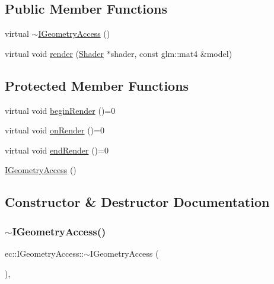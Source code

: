 \subsection*{Public Member Functions}
\begin{DoxyCompactItemize}
\item 
virtual \mbox{\hyperlink{classec_1_1_i_geometry_access_a786b4a8489f1c7fd6c4c2685fc53e7dc}{$\sim$\+I\+Geometry\+Access}} ()
\item 
virtual void \mbox{\hyperlink{classec_1_1_i_geometry_access_a478e674624120a644c05be9be4e386b8}{render}} (\mbox{\hyperlink{classec_1_1_shader}{Shader}} $\ast$shader, const glm\+::mat4 \&model)
\end{DoxyCompactItemize}
\subsection*{Protected Member Functions}
\begin{DoxyCompactItemize}
\item 
virtual void \mbox{\hyperlink{classec_1_1_i_geometry_access_a17a87aca44e2a23a6185e78262e02652}{begin\+Render}} ()=0
\item 
virtual void \mbox{\hyperlink{classec_1_1_i_geometry_access_a2ee418c9fa4eb266347bae2f0ef8095b}{on\+Render}} ()=0
\item 
virtual void \mbox{\hyperlink{classec_1_1_i_geometry_access_a6d3b9c34a8b73aeac26663ef349ce41f}{end\+Render}} ()=0
\item 
\mbox{\hyperlink{classec_1_1_i_geometry_access_aaf9faa0f583e89aa0b27db7cecbb7c6e}{I\+Geometry\+Access}} ()
\end{DoxyCompactItemize}


\subsection{Constructor \& Destructor Documentation}
\mbox{\label{classec_1_1_i_geometry_access_a786b4a8489f1c7fd6c4c2685fc53e7dc}} 
\subsubsection{\texorpdfstring{$\sim$\+I\+Geometry\+Access()}{~IGeometryAccess()}}
{\footnotesize\ttfamily ec\+::\+I\+Geometry\+Access\+::$\sim$\+I\+Geometry\+Access (\begin{DoxyParamCaption}{ }\end{DoxyParamCaption})\hspace{0.3cm}{\ttfamily [virtual]}, {\ttfamily [default]}}

